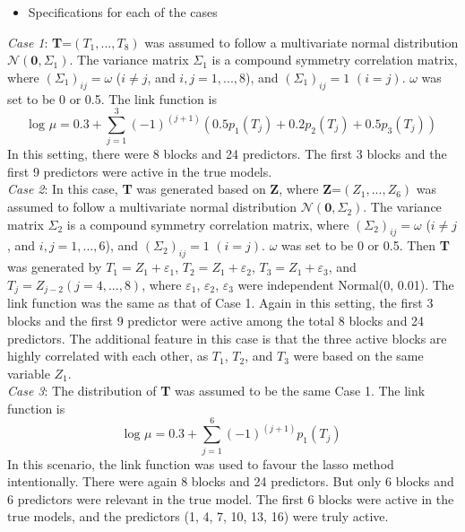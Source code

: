 \documentclass[paper=a4, fontsize=11pt]{scrartcl} %
\begin{document}
\begin{itemize}
\item Specifications for each of the cases\\
\end{itemize}

\textit{Case 1}: \textbf{T}=$(T_{1},...,T_{8})$ was assumed to follow a multivariate normal distribution $\mathcal{N}(\mathbf{0},\Sigma_{1})$. The variance matrix $\Sigma_{1}$ is a compound symmetry correlation matrix, where  $(\Sigma_{1})_{ij}=\omega$ ($i \neq j$, and $i, j=1,...,8$), and $(\Sigma_{1})_{ij}=1$ $(i=j)$. $\omega$ was set to be 0 or 0.5. The link function is
\begin{equation*}
\textrm{log }\mu =0.3+\sum\limits_{j=1}^3(-1)^{(j+1)}(0.5p_{1}(T_{j})+0.2p_{2}(T_{j})+0.5p_{3}(T_{j}))
\end{equation*}
In this setting, there were 8 blocks and 24 predictors. The first 3 blocks and the first 9 predictors were active in the true models.\\


\textit{Case 2}: In this case, \textbf{T} was generated based on \textbf{Z}, where \textbf{Z}=$(Z_{1},...,Z_{6})$ was assumed to follow a multivariate normal distribution $\mathcal{N}(\mathbf{0},\Sigma_{2})$. The variance matrix $\Sigma_{2}$ is a compound symmetry correlation matrix, where  $(\Sigma_{2})_{ij}=\omega$ ($i \neq j$, and $i, j=1,...,6$), and $(\Sigma_{2})_{ij}=1$ $(i=j)$. $\omega$ was set to be 0 or 0.5. Then \textbf{T} was generated by $T_{1}=Z_{1}+\varepsilon_{1}$, $T_{2}=Z_{1}+\varepsilon_{2}$, $T_{3}=Z_{1}+\varepsilon_{3}$, and $T_{j}=Z_{j-2} (j=4,...,8)$, where $\varepsilon_{1}$, $\varepsilon_{2}$, $\varepsilon_{3}$ were independent Normal(0, 0.01). The link function was the same as that of Case 1. Again in this setting, the first 3 blocks and the first 9 predictor were active among the total 8 blocks and 24 predictors. The additional feature in this case is that the three active blocks are highly correlated with each other, as $T_{1}$, $T_{2}$, and $T_{3}$ were based on the same variable $Z_{1}$.\\

\textit{Case 3}: The distribution of \textbf{T} was assumed to be the same Case 1. The link function is
\begin{equation*}
\textrm{log }\mu =0.3+\sum\limits_{j=1}^6(-1)^{(j+1)}p_{1}(T_{j})
\end{equation*} 
In this scenario, the link function was used to favour the lasso method intentionally. There were again 8 blocks and 24 predictors. But only 6 blocks and 6 predictors were relevant in the true model. The first 6 blocks were active in the true models, and the predictors (1, 4, 7, 10, 13, 16) were truly active.\\
\end{document}
